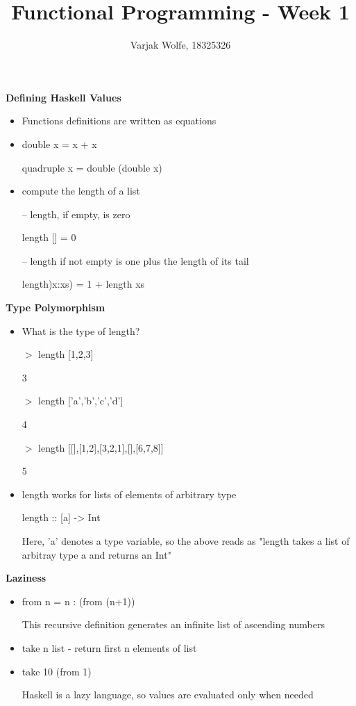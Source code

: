 \documentclass{article}
\title{Functional Programming - Week 1}
\author{Varjak Wolfe, 18325326}
\begin{document}
\textbf{Defining Haskell Values}


\begin{itemize}
  \item Functions definitions are written as equations
  \item double x = x + x

quadruple x = double (double x)
  \item compute the length of a list

-- length, if empty, is zero

length [] = 0

-- length if not empty is one plus the length of its tail

length)x:xs) = 1 + length xs
\end{itemize}


\textbf{Type Polymorphism}


\begin{itemize}
\item What is the type of length?

$>$ length [1,2,3]

3

$>$ length [’a’,’b’,’c’,’d’]

4

$>$ length [[],[1,2],[3,2,1],[],[6,7,8]]

5

\item length works for lists of elements of arbitrary type

length :: [a] -> Int

Here, 'a' denotes a type variable, so the above reads as "length takes a list of arbitray type a and returns an Int"

\end{itemize}


\textbf{Laziness}

\begin{itemize}
\item from n = n : (from (n+1))

This recursive definition generates an infinite list of ascending numbers

\item take n list - return first n elements of list

\item take 10 (from 1)

Haskell is a lazy language, so values are evaluated only when needed
\end{itemize}
\end{document}
